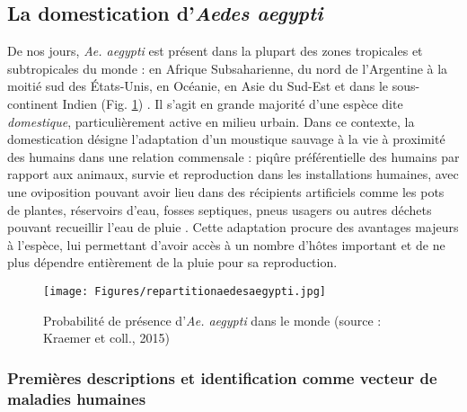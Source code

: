  
\subsection{La domestication d'{\em Aedes aegypti}}

De nos jours, {\em Ae. aegypti} est présent dans la plupart des zones tropicales et subtropicales du monde : en Afrique Subsaharienne, du nord de l'Argentine à la moitié sud des États-Unis, en Océanie, en Asie du Sud-Est et dans le sous-continent Indien (Fig. \ref{fig:repartitionaedesaegypti}) \cite{kraemer2015global}.
Il s'agit en grande majorité d'une espèce dite {\em domestique}, particulièrement active en milieu urbain.
Dans ce contexte, la domestication désigne l'adaptation d'un moustique sauvage à la vie à proximité des humains dans une relation commensale : piqûre préférentielle des humains par rapport aux animaux, survie et reproduction dans les installations humaines, avec une oviposition pouvant avoir lieu dans des récipients artificiels comme les pots de plantes, réservoirs d'eau, fosses septiques, pneus usagers ou autres déchets pouvant recueillir l'eau de pluie  \cite{christophers1960aedes}.
Cette adaptation procure des avantages majeurs à l'espèce, lui permettant d'avoir accès à un nombre  d'hôtes important et de ne plus dépendre entièrement de la pluie pour sa reproduction.


\begin{figure}[t]
	\centering
	\texttt{[image: Figures/repartitionaedesaegypti.jpg]}
	\caption{Probabilité de présence d'{\em Ae. aegypti} dans le monde (source : Kraemer et coll., 2015)}
	\label{fig:repartitionaedesaegypti}
\end{figure}


\subsubsection{Premières descriptions et identification comme vecteur de maladies humaines}

